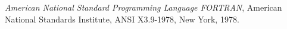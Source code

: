 {\em American National Standard Programming Language FORTRAN},
American National Standards Institute, ANSI X3.9-1978, New York, 1978.
